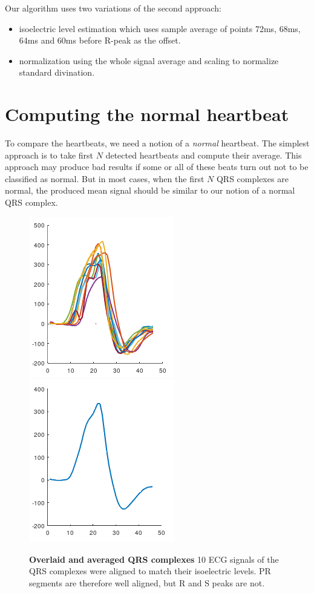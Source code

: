 \documentclass[fleqn,moreauthors,10pt]{ds_report}
\begin{document}
\noindent
Our algorithm uses two variations of the second approach:
\begin{itemize}
	\item isoelectric level estimation which uses sample average of points 72ms, 68ms, 64ms and 60ms before R-peak as the offset.
	\item normalization using the whole signal average and scaling to normalize standard divination.
\end{itemize}

\section*{Computing the normal heartbeat}

To compare the heartbeats, we need a notion of a \textit{normal} heartbeat. The simplest approach is to take first $N$ detected heartbeats and compute their average. This approach may produce bad results if some or all of these beats turn out not to be classified as normal. But in most cases, when the first $N$ QRS complexes are normal, the produced mean signal should be similar to our notion of a normal QRS complex. 

\begin{figure}[ht]\centering
	\includegraphics[width=0.49\linewidth]{mean_beat_stacked_iso_est.png}
	\includegraphics[width=0.49\linewidth]{mean_beat_mean_iso_est.png}
	\caption{\textbf{Overlaid and averaged QRS complexes} 10 ECG signals of the QRS complexes were aligned to match their isoelectric levels. PR segments are therefore well aligned, but R and S peaks are not.}
	\label{fig:mean_beat_iso_est}
\end{figure}
\end{document}
